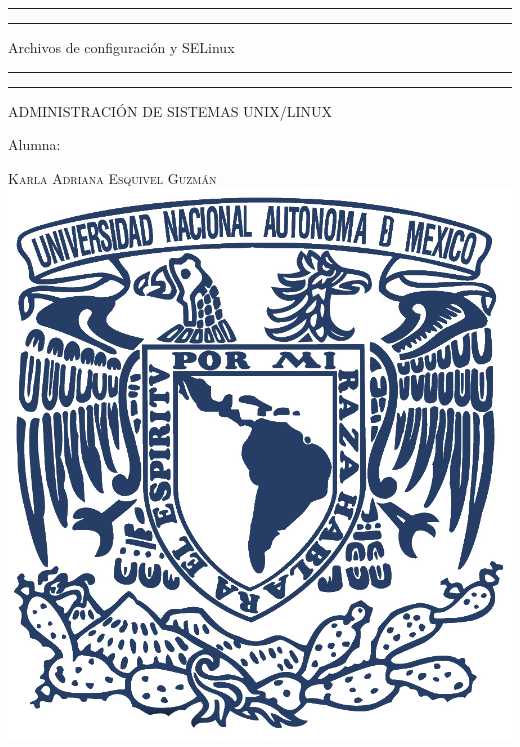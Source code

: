 \documentclass[a4paper, 11pt, oneside]{article}
\begin{document}
 

\begin{titlepage} 

	\centering 
	
	\scshape 
	
	\vspace*{\baselineskip} 
	
	
	
	\rule{\textwidth}{1.6pt}\vspace*{-\baselineskip}\vspace*{2pt} 
	\rule{\textwidth}{0.4pt} 
	
	\vspace{0.75\baselineskip} 
	
	{\LARGE Archivos de configuración y SELinux}	
	\vspace{0.75\baselineskip} 
	
	\rule{\textwidth}{0.4pt}\vspace*{-\baselineskip}\vspace{3.2pt}
	\rule{\textwidth}{1.6pt} 
	
	\vspace{2\baselineskip} 
	

	ADMINISTRACIÓN DE SISTEMAS UNIX/LINUX
	
	\vspace*{3\baselineskip} 
	
	
	
	Alumna:
	
	\vspace{0.5\baselineskip} 
	
	{\scshape\Large Karla Adriana Esquivel Guzmán \\} 
	\vspace{0.5\baselineskip} 
	\vfill
	\includegraphics{unam.jpg}
	

\end{titlepage}
\end{document}
